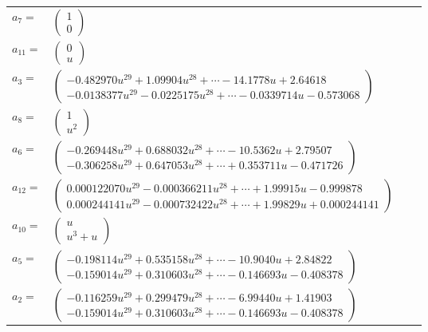 \documentclass[1p]{elsarticle_modified}
\theoremstyle{definition}
\begin{document}
\begin{tabular}{m{7pt} m{180pt} m{7pt} m{180pt} }
\flushright $a_{7}=$&$\begin{pmatrix}1\\0\end{pmatrix}$ \\
\flushright $a_{11}=$&$\begin{pmatrix}0\\u\end{pmatrix}$ \\
\flushright $a_{3}=$&$\begin{pmatrix}-0.482970 u^{29}+1.09904 u^{28}+\cdots-14.1778 u+2.64618\\-0.0138377 u^{29}-0.0225175 u^{28}+\cdots-0.0339714 u-0.573068\end{pmatrix}$ \\
\flushright $a_{8}=$&$\begin{pmatrix}1\\u^2\end{pmatrix}$ \\
\flushright $a_{6}=$&$\begin{pmatrix}-0.269448 u^{29}+0.688032 u^{28}+\cdots-10.5362 u+2.79507\\-0.306258 u^{29}+0.647053 u^{28}+\cdots+0.353711 u-0.471726\end{pmatrix}$ \\
\flushright $a_{12}=$&$\begin{pmatrix}0.000122070 u^{29}-0.000366211 u^{28}+\cdots+1.99915 u-0.999878\\0.000244141 u^{29}-0.000732422 u^{28}+\cdots+1.99829 u+0.000244141\end{pmatrix}$ \\
\flushright $a_{10}=$&$\begin{pmatrix}u\\u^3+u\end{pmatrix}$ \\
\flushright $a_{5}=$&$\begin{pmatrix}-0.198114 u^{29}+0.535158 u^{28}+\cdots-10.9040 u+2.84822\\-0.159014 u^{29}+0.310603 u^{28}+\cdots-0.146693 u-0.408378\end{pmatrix}$ \\
\flushright $a_{2}=$&$\begin{pmatrix}-0.116259 u^{29}+0.299479 u^{28}+\cdots-6.99440 u+1.41903\\-0.159014 u^{29}+0.310603 u^{28}+\cdots-0.146693 u-0.408378\end{pmatrix}$ \\

\end{tabular}
\end{document}

